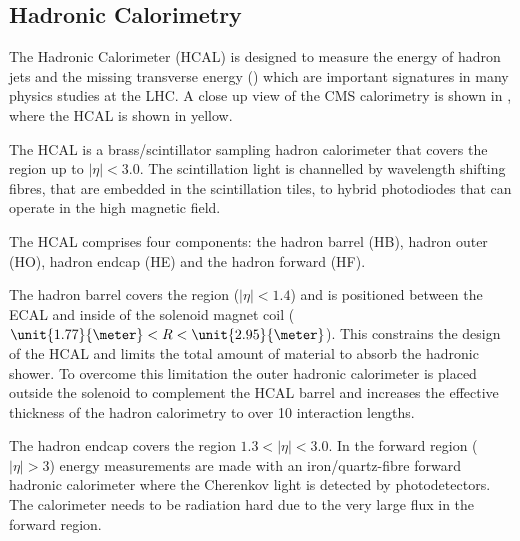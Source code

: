 \subsection{Hadronic Calorimetry}

The Hadronic Calorimeter (HCAL) is designed to measure the energy of
hadron jets and the missing transverse energy (\met) which are important
signatures in many physics studies at the LHC.
A close up view of the CMS calorimetry is shown in , where the
HCAL is shown in yellow.

The HCAL is a brass/scintillator sampling hadron calorimeter that covers the
region up to $|\eta|<3.0$.
The scintillation light is channelled by wavelength shifting fibres, that are
embedded in the scintillation tiles, to hybrid photodiodes that can operate in
the high magnetic field. \cite{cms}

The HCAL comprises four components: the hadron barrel (HB), hadron outer (HO),
hadron endcap (HE) and the hadron forward (HF).

The hadron barrel covers the region ($|\eta| < 1.4$) and is positioned between
the ECAL and inside of the solenoid magnet coil
($\unit{1.77}{\meter}<R<\unit{2.95}{\meter}$).
This constrains the design of the HCAL and limits the total amount of material
to absorb the hadronic shower. 
To overcome this limitation the outer hadronic calorimeter is
placed outside the solenoid to complement the HCAL barrel and increases the
effective thickness of the hadron calorimetry to over 10 interaction lengths.

The hadron endcap covers the region $1.3 < |\eta| < 3.0$.
In the forward region ($|\eta| > 3$) energy measurements are made with an
iron/quartz-fibre forward hadronic calorimeter where the Cherenkov light is
detected by photodetectors. The calorimeter needs to be radiation hard 
due to the very large flux in the forward region.

